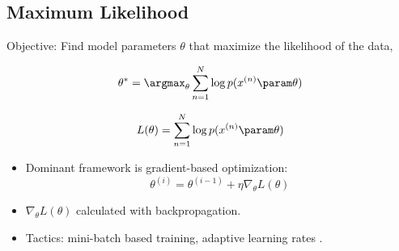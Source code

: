 
\subsection{Maximum Likelihood}

\begin{frame}
 Objective: Find model parameters $\theta$ that maximize the likelihood of the data,
        
    \[ \theta^* = \argmax_\theta\sum_{n=1}^N \log p(x^{(n)} \param \theta) \]

\end{frame}

\begin{frame}
    \[  L(\theta) =  \sum_{n=1}^N \log p(x^{(n)} \param \theta)  \]
        \begin{center}
\end{center}
    \begin{itemize}
        \item Dominant framework is gradient-based optimization: 
        \[ \theta^{(i)} = \theta^{(i-1)} + \eta \nabla_\theta L(\theta)\]
        \item $\nabla_\theta L(\theta)$ calculated with backpropagation.
        \item Tactics: mini-batch based training, adaptive learning rates \citep{duchi2011,Kingma2015}.
    \end{itemize}
\end{frame}

